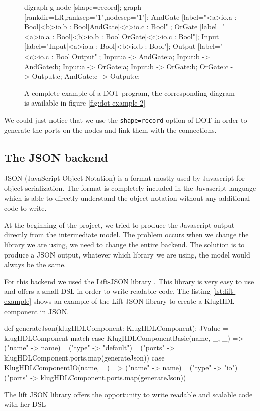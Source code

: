 \begin{figure}[H]
  \centering
  \begin{textcode}
    digraph g {
      node [shape=record];
      graph [rankdir=LR,ranksep="1",nodesep="1"];
      AndGate [label="{{<a>io.a : Bool|<b>io.b : Bool}|AndGate|{<c>io.c : Bool}}"];
      OrGate [label="{{<a>io.a : Bool|<b>io.b : Bool}|OrGate|{<c>io.c : Bool}}"];
      Input [label="{Input|{<a>io.a : Bool|<b>io.b : Bool}}"];
      Output [label="{{<c>io.c : Bool}|Output}"];
      Input:a -> AndGate:a;      Input:b -> AndGate:b;
      Input:a -> OrGate:a;       Input:b -> OrGate:b;
      OrGate:c -> Output:c;      AndGate:c -> Output:c;
    }
  \end{textcode}
  \caption[Example of a Graphviz program]{A complete example of a DOT program,
    the corresponding diagram is available in figure \ref{fig:dot-example-2}}
  \label{lst:dot-example-2}
\end{figure}

We could just notice that we use the \verb|shape=record| option of DOT in order
to generate the ports on the nodes and link them with the connections.

\subsection{The JSON backend}
\label{sec:json-backend}

JSON (JavaScript Object Notation) is a format mostly used by Javascript for
object serialization. The format is completely included in the Javascript
language which is able to directly understand the object notation without any
additional code to write.

At the beginning of the project, we tried to produce the Javascript
output directly from the intermediate model. The problem occurs when we change
the library we are using, we need to change the entire backend. The solution is
to produce a JSON output, whatever which library we are using, the model would
always be the same.

For this backend we used the Lift-JSON library \cite{liftweb}. This library is
very easy to use and offers a small DSL in order to write readable code. The
listing \ref{lst:lift-example} shows an example of the Lift-JSON library to create a
KlugHDL component in JSON.

\begin{listing}[H]
  \centering
  \begin{scalacode}
  def generateJson(klugHDLComponent: KlugHDLComponent): JValue = klugHDLComponent match {
    case KlugHDLComponentBasic(name, _, _) =>
      ("name" -> name) ~
      ("type" -> "default") ~
      ("ports" -> klugHDLComponent.ports.map(generateJson))
    case KlugHDLComponentIO(name, _) =>
      ("name" -> name) ~
      ("type" -> "io") ~
      ("ports" -> klugHDLComponent.ports.map(generateJson))
  }
  \end{scalacode}
  \caption[Lift library example : a JSON DSL]{The lift JSON library offers the
    opportunity to write readable and scalable code with her DSL}
  \label{lst:lift-example}
\end{listing}

